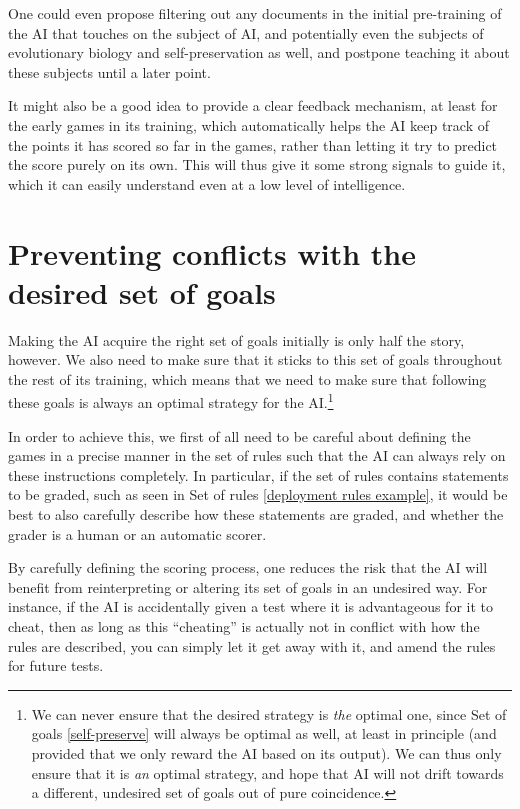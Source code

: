 \documentclass{article}
\begin{document}
One could even propose filtering out any documents in the initial pre-training of the AI that touches on the subject of AI, and potentially even the subjects of evolutionary biology and self-preservation as well, and postpone teaching it about these subjects until a later point.

It might also be a good idea to provide a clear feedback mechanism, at least for the early games in its training, which automatically helps the AI keep track of the points it has scored so far in the games, rather than letting it try to predict the score purely on its own. This will thus give it some strong signals to guide it, which it can easily understand even at a low level of intelligence.


\section{Preventing conflicts with the desired set of goals}

Making the AI acquire the right set of goals initially is only half the story, however. We also need to make sure that it sticks to this set of goals throughout the rest of its training, which means that we need to make sure that following these goals is always an optimal strategy for the AI.\footnote{
	We can never ensure that the desired strategy is \emph{the} optimal one, since Set of goals \ref{self-preserve} will always be optimal as well, at least in principle (and provided that we only reward the AI based on its output). We can thus only ensure that it is \emph{an} optimal strategy, and hope that AI will not drift towards a different, undesired set of goals out of pure coincidence.
}

In order to achieve this, we first of all need to be careful about defining the games in a precise manner in the set of rules such that the AI can always rely on these instructions completely. In particular, if the set of rules contains statements to be graded, such as seen in Set of rules \ref{deployment rules example}, it would be best to also carefully describe how these statements are graded, and whether the grader is a human or an automatic scorer.

By carefully defining the scoring process, one reduces the risk that the AI will benefit from reinterpreting or altering its set of goals in an undesired way. For instance, if the AI is accidentally given a test where it is advantageous for it to cheat, then as long as this ``cheating'' is actually not in conflict with how the rules are described, you can simply let it get away with it, and amend the rules for future tests.
\end{document}
